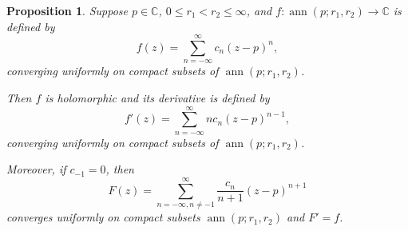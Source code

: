 \documentclass[12pt,openany]{book}
\newcommand{\ann}{\operatorname{ann}}
\newcommand{\C}{{\mathbb{C}}}
\theoremstyle{plain}
\newtheorem{prop}[thm]{Proposition}
\theoremstyle{remark}
\theoremstyle{definition}
\theoremstyle{exercise}
\theoremstyle{example}
\begin{document}
\begin{prop} \label{prop:diffantidifflaurent}
Suppose $p \in \C$, $0 \leq r_1 < r_2 \leq \infty$, and
$f \colon \ann(p;r_1,r_2) \to \C$ is defined by
\begin{equation*}
f(z) = \sum_{n=-\infty}^\infty c_n {(z-p)}^n ,
\end{equation*}
converging uniformly on compact subsets of $\ann(p;r_1,r_2)$.

Then $f$ is holomorphic and its 
derivative is defined by
\begin{equation*}
f'(z) = \sum_{n=-\infty}^\infty n c_n {(z-p)}^{n-1} ,
\end{equation*}
converging uniformly on compact subsets of $\ann(p;r_1,r_2)$.

Moreover, if $c_{-1} = 0$, then
\begin{equation*}
F(z) = \sum_{n=-\infty,n\not=-1}^\infty \frac{c_n}{n+1} {(z-p)}^{n+1}
\end{equation*}
converges uniformly on compact subsets 
$\ann(p;r_1,r_2)$ and $F' = f$.
\end{prop}
\end{document}
